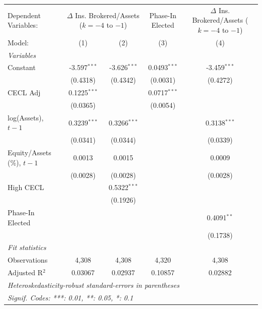 
\begingroup
\centering
\begin{tabular}{lcccc}
   \tabularnewline \midrule \midrule
   Dependent Variables: & \multicolumn{2}{c}{$\Delta$ Ins. Brokered/Assets ($k{=}{-}4$ to $-1$)} & Phase-In Elected & $\Delta$ Ins. Brokered/Assets ($k{=}{-}4$ to $-1$)\\
   Model:                       & (1)            & (2)            & (3)            & (4)\\  
   \midrule
   \emph{Variables}\\
   Constant                     & -3.597$^{***}$ & -3.626$^{***}$ & 0.0493$^{***}$ & -3.459$^{***}$\\   
                                & (0.4318)       & (0.4342)       & (0.0031)       & (0.4272)\\   
   CECL Adj                     & 0.1225$^{***}$ &                & 0.0717$^{***}$ &   \\   
                                & (0.0365)       &                & (0.0054)       &   \\   
   log(Assets), $t{-}1$         & 0.3239$^{***}$ & 0.3266$^{***}$ &                & 0.3138$^{***}$\\   
                                & (0.0341)       & (0.0344)       &                & (0.0339)\\   
   Equity/Assets (\%), $t{-}1$  & 0.0013         & 0.0015         &                & 0.0009\\   
                                & (0.0028)       & (0.0028)       &                & (0.0028)\\   
   High CECL                    &                & 0.5322$^{***}$ &                &   \\   
                                &                & (0.1926)       &                &   \\   
   Phase-In Elected             &                &                &                & 0.4091$^{**}$\\   
                                &                &                &                & (0.1738)\\   
   \midrule
   \emph{Fit statistics}\\
   Observations                 & 4,308          & 4,308          & 4,320          & 4,308\\  
   Adjusted R$^2$               & 0.03067        & 0.02937        & 0.10857        & 0.02882\\  
   \midrule \midrule
   \multicolumn{5}{l}{\emph{Heteroskedasticity-robust standard-errors in parentheses}}\\
   \multicolumn{5}{l}{\emph{Signif. Codes: ***: 0.01, **: 0.05, *: 0.1}}\\
\end{tabular}
\par\endgroup


